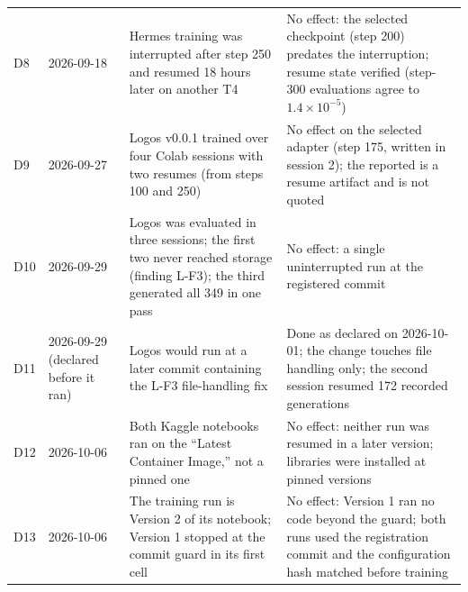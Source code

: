 \begin{table}[H]
\begin{tabular}{L{8mm}L{16mm}L{70mm}L{58mm}}
D8 & 2026-09-18 & Hermes training was interrupted after step 250 and resumed 18 hours later on another T4 & No effect: the selected checkpoint (step 200) predates the interruption; resume state verified (step-300 evaluations agree to $1.4 \times 10^{-5}$) \\
D9 & 2026-09-27 & Logos v0.0.1 trained over four Colab sessions with two resumes (from steps 100 and 250) & No effect on the selected adapter (step 175, written in session 2); the reported  is a resume artifact and is not quoted \\
D10 & 2026-09-29 & Logos  was evaluated in three sessions; the first two never reached storage (finding L-F3); the third generated all 349 in one pass & No effect: a single uninterrupted run at the registered commit \\
D11 & 2026-09-29 (declared before it ran) & Logos  would run at a later commit containing the L-F3 file-handling fix & Done as declared on 2026-10-01; the change touches file handling only; the second session resumed 172 recorded generations \\
D12 & 2026-10-06 & Both Kaggle notebooks ran on the ``Latest Container Image,'' not a pinned one & No effect: neither run was resumed in a later version; libraries were installed at pinned versions \\
D13 & 2026-10-06 & The training run is Version 2 of its notebook; Version 1 stopped at the commit guard in its first cell & No effect: Version 1 ran no code beyond the guard; both runs used the registration commit and the configuration hash matched before training \\
\bottomrule
\end{tabular}
\end{table}

